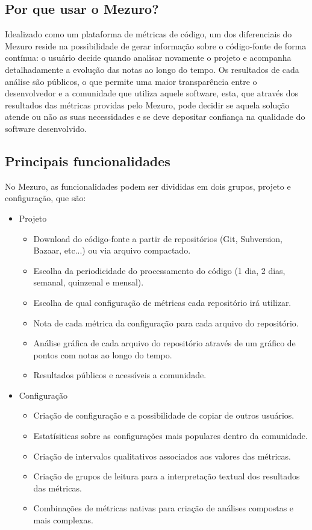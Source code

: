 \documentclass[12pt]{article}
\begin{document}
  \subsection{Por que usar o Mezuro?} \label{sec:projeto-mezuro}
  Idealizado como um plataforma de métricas de código, um dos diferenciais do Mezuro reside na possibilidade de gerar informação sobre o código-fonte de forma contínua: o usuário decide quando analisar novamente o projeto e acompanha detalhadamente a evolução das notas ao longo do tempo. Os resultados de cada análise são públicos, o que permite uma maior transparência entre o desenvolvedor e a comunidade que utiliza aquele software, esta, que através dos resultados das métricas providas pelo Mezuro, pode decidir se aquela solução atende ou não as suas necessidades e se deve depositar confiança na qualidade do software desenvolvido.

  \subsection{Principais funcionalidades}\label{sec:princ-funcionalidades}
  No Mezuro, as funcionalidades podem ser divididas em dois grupos, projeto e configuração, que são:

  \begin{itemize}
    \item Projeto
      \begin{itemize}
      \item Download do código-fonte a partir de repositórios (Git, Subversion, Bazaar, etc...) ou via arquivo compactado.
          \item Escolha da periodicidade do processamento do código (1 dia, 2 dias, semanal, quinzenal e mensal).
          \item Escolha de qual configuração de métricas cada repositório irá utilizar.
          \item Nota de cada métrica da configuração para cada arquivo do repositório.
          \item Análise gráfica de cada arquivo do repositório através de um gráfico de pontos com notas ao longo do tempo.
          \item Resultados públicos e acessíveis a comunidade.
      \end{itemize}
      \item Configuração
      \begin{itemize}
      \item Criação de configuração e a possibilidade de copiar de outros usuários.
          \item Estatísiticas sobre as configurações mais populares dentro da comunidade.
          \item Criação de intervalos qualitativos associados aos valores das métricas.
          \item Criação de grupos de leitura para a interpretação textual dos resultados das métricas.
          \item Combinações de métricas nativas para criação de análises compostas e mais complexas.
      \end{itemize}
  \end{itemize}
\end{document}
